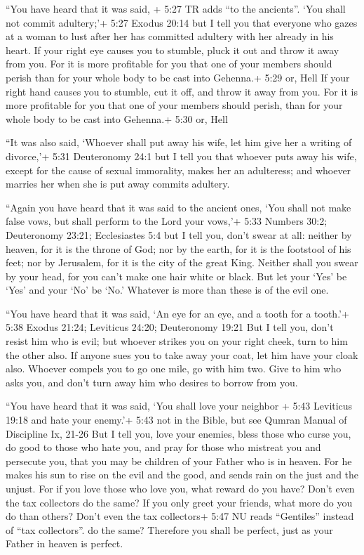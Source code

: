  ``You have heard that it was said, + 5:27 TR adds ``to the
ancients''. `You shall not commit adultery;'+ 5:27 Exodus 20:14
 but I tell you that everyone who gazes at a woman to lust
after her has committed adultery with her already in his heart.
 If your right eye causes you to stumble, pluck it out and
throw it away from you. For it is more profitable for you that one of
your members should perish than for your whole body to be cast into
Gehenna.+ 5:29 or, Hell  If your right hand causes you to
stumble, cut it off, and throw it away from you. For it is more
profitable for you that one of your members should perish, than for your
whole body to be cast into Gehenna.+ 5:30 or, Hell

 ``It was also said, `Whoever shall put away his wife, let
him give her a writing of divorce,'+ 5:31 Deuteronomy 24:1 
but I tell you that whoever puts away his wife, except for the cause of
sexual immorality, makes her an adulteress; and whoever marries her when
she is put away commits adultery.

 ``Again you have heard that it was said to the ancient
ones, `You shall not make false vows, but shall perform to the Lord your
vows,'+ 5:33 Numbers 30:2; Deuteronomy 23:21; Ecclesiastes 5:4
 but I tell you, don't swear at all: neither by heaven, for
it is the throne of God;  nor by the earth, for it is the
footstool of his feet; nor by Jerusalem, for it is the city of the great
King.  Neither shall you swear by your head, for you can't
make one hair white or black.  But let your `Yes' be `Yes'
and your `No' be `No.' Whatever is more than these is of the evil one.

 ``You have heard that it was said, `An eye for an eye, and
a tooth for a tooth.'+ 5:38 Exodus 21:24; Leviticus 24:20; Deuteronomy
19:21  But I tell you, don't resist him who is evil; but
whoever strikes you on your right cheek, turn to him the other also.
 If anyone sues you to take away your coat, let him have
your cloak also.  Whoever compels you to go one mile, go
with him two.  Give to him who asks you, and don't turn
away him who desires to borrow from you.

 ``You have heard that it was said, `You shall love your
neighbor + 5:43 Leviticus 19:18 and hate your enemy.'+ 5:43 not in the
Bible, but see Qumran Manual of Discipline Ix, 21-26  But I
tell you, love your enemies, bless those who curse you, do good to those
who hate you, and pray for those who mistreat you and persecute you,
 that you may be children of your Father who is in heaven.
For he makes his sun to rise on the evil and the good, and sends rain on
the just and the unjust.  For if you love those who love
you, what reward do you have? Don't even the tax collectors do the same?
 If you only greet your friends, what more do you do than
others? Don't even the tax collectors+ 5:47 NU reads ``Gentiles''
instead of ``tax collectors''. do the same?  Therefore you
shall be perfect, just as your Father in heaven is perfect.

